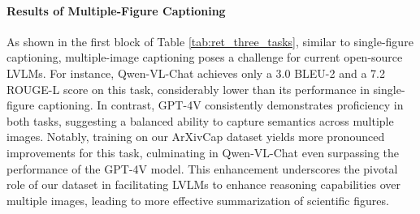 
\paragraph{Results of Multiple-Figure Captioning}
As shown in the first block of Table \ref{tab:ret_three_tasks}, similar to single-figure captioning, multiple-image captioning poses a challenge for current open-source LVLMs. For instance, Qwen-VL-Chat achieves only a 3.0 BLEU-2 and a 7.2 ROUGE-L score on this task, considerably lower than its performance in single-figure captioning. In contrast, GPT-4V consistently demonstrates proficiency in both tasks, suggesting a balanced ability to capture semantics across multiple images. Notably, training on our ArXivCap dataset yields more pronounced improvements for this task, culminating in Qwen-VL-Chat even surpassing the performance of the GPT-4V model. This enhancement underscores the pivotal role of our dataset in facilitating LVLMs to enhance reasoning capabilities over multiple images, leading to more effective summarization of scientific figures.


